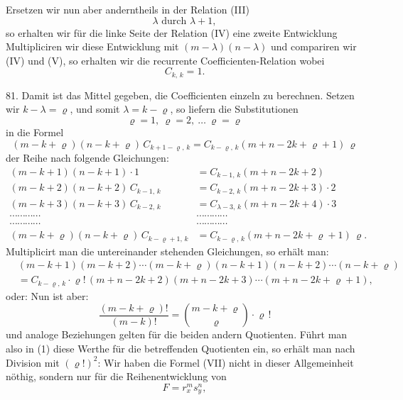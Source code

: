Ersetzen wir nun aber anderntheils in der Relation (III)
\[
\lambda \text{ durch } \lambda + 1,
\]
so erhalten wir für die linke Seite der Relation (IV) eine zweite Entwicklung
Multipliciren wir diese Entwicklung mit $(m-\lambda)(n-\lambda)$ und compariren wir (IV) und (V), so erhalten wir die recurrente Coefficienten-Relation
wobei
\[
C_{k,\,k}=1.
\]

81. Damit ist das Mittel gegeben, die Coefficienten einzeln zu berechnen. Setzen wir $k-\lambda=\varrho$, und somit $\lambda=k-\varrho$, so liefern die Substitutionen
\[
\varrho=1,\ \varrho=2,\ \dots\ \varrho=\varrho
\]
in die Formel
\[
(m-k+\varrho)(n-k+\varrho)\,C_{k+1-\varrho,\,k}=C_{k-\varrho,\,k}(m+n-2k+\varrho+1)\,\varrho
\]
der Reihe nach folgende Gleichungen:
\begin{align*}
(m-k+1)(n-k+1)\cdot 1 &= C_{k-1,\,k}(m+n-2k+2)\\
(m-k+2)(n-k+2)\,C_{k-1,\,k} &= C_{k-2,\,k}(m+n-2k+3)\cdot 2\\
(m-k+3)(n-k+3)\,C_{k-2,\,k} &= C_{\lambda-3,\,k}(m+n-2k+4)\cdot 3 %
\\
\cdots\cdots\cdots\cdots &\cdots\cdots\cdots\cdots\\
\cdots\cdots\cdots\cdots &\cdots\cdots\cdots\cdots\\
(m-k+\varrho)(n-k+\varrho)\,C_{k-\varrho+1,\,k} &= C_{k-\varrho,\,k}(m+n-2k+\varrho+1)\,\varrho.
\end{align*}
Multiplicirt man die untereinander stehenden Gleichungen, so erhält man:
\begin{align*}
&(m-k+1)(m-k+2)\cdots(m-k+\varrho)(n-k+1)(n-k+2)\cdots(n-k+\varrho)\\
&= C_{k-\varrho,\,k}\cdot \varrho!\,(m+n-2k+2)(m+n-2k+3)\cdots(m+n-2k+\varrho+1),
\end{align*}
oder:
Nun ist aber:
\[
\frac{(m-k+\varrho)!}{(m-k)!}=\binom{m-k+\varrho}{\varrho}\cdot \varrho\,!
\]
und analoge Beziehungen gelten für die beiden andern Quotienten. Führt man also in (1) diese Werthe für die betreffenden Quotienten ein, so erhält man nach Division mit $(\varrho!)^2$:
Wir haben die Formel (VII) nicht in dieser Allgemeinheit nöthig, sondern nur für die Reihenentwicklung von
\[
F=r_x^m s_y^n,
\]



